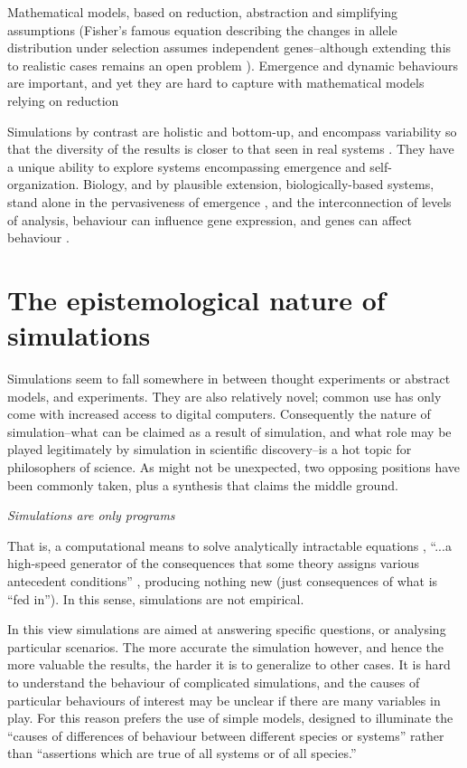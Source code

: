 Mathematical models, based on reduction, abstraction and simplifying assumptions (\eg Fisher's famous equation describing the changes in allele distribution under selection assumes independent genes--although extending this to realistic cases remains an open problem \parencite{Schuster2011}). Emergence and dynamic behaviours are important, and yet they are hard to capture with mathematical models relying on reduction \parencite{Ferrer:2008hv}

Simulations by contrast are holistic and bottom-up, and encompass variability so that the diversity of the results is closer to that seen in real systems \parencite{Ferrer:2008hv}. They have a unique ability to explore systems encompassing emergence and self-organization. Biology, and by plausible extension, biologically-based systems, stand alone in the pervasiveness of emergence \parencite{Bersini:2006ve}, and the interconnection of levels of analysis, \eg behaviour can influence gene expression, and genes can affect behaviour \parencite{Krakauer2011}.

\section{The epistemological nature of simulations}\label{the-epistemological-nature-of-simulations}

Simulations seem to fall somewhere in between thought experiments or abstract models, and experiments. They are also relatively novel; common use has only come with increased access to digital computers. Consequently the nature of simulation--what can be claimed as a result of simulation, and what role may be played legitimately by simulation in scientific discovery--is a hot topic for philosophers of science. As might not be unexpected, two opposing positions have been commonly taken, plus a synthesis that claims the middle ground.

\emph{Simulations are only programs}

That is, a computational means to solve analytically intractable equations \parencite[31]{Winsberg2010}, ``...a high-speed generator of the consequences that some theory assigns various antecedent conditions'' \parencite[quoting from Dennett]{Eldridge}, producing nothing new (just consequences of what is ``fed in''\parencite{DiPaolo2000}). In this sense, simulations are not empirical.

In this view simulations are aimed at answering specific questions, or analysing particular scenarios. The more accurate the simulation however, and hence the more valuable the results, the harder it is to generalize to other cases. It is hard to understand the behaviour of complicated simulations, and the causes of particular behaviours of interest may be unclear if there are many variables in play. For this reason \parencite{MaynardSmith1974} prefers the use of simple models, designed to illuminate the ``causes of differences of behaviour between different species or systems'' rather than ``assertions which are true of all systems or of all species.''

